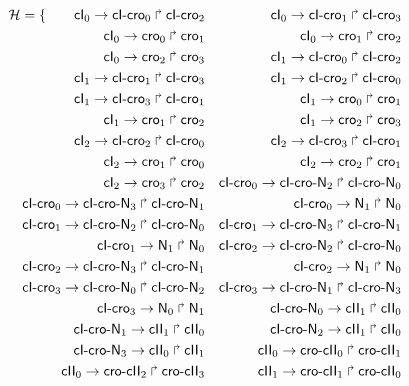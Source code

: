 
\clearpage


\small
\begin{align*}
\PHh = \{ \qquad
  \PHfrappe{\cI_0}{\cIcro_0}{\cIcro_2} &&
  \PHfrappe{\cI_0}{\cIcro_1}{\cIcro_3} \\
  \PHfrappe{\cI_0}{\cro_0}{\cro_1} &&
  \PHfrappe{\cI_0}{\cro_1}{\cro_2} \\
  \PHfrappe{\cI_0}{\cro_2}{\cro_3} &&
  \PHfrappe{\cI_1}{\cIcro_0}{\cIcro_2} \\
  \PHfrappe{\cI_1}{\cIcro_1}{\cIcro_3} &&
  \PHfrappe{\cI_1}{\cIcro_2}{\cIcro_0} \\
  \PHfrappe{\cI_1}{\cIcro_3}{\cIcro_1} &&
  \PHfrappe{\cI_1}{\cro_0}{\cro_1} \\
  \PHfrappe{\cI_1}{\cro_1}{\cro_2} &&
  \PHfrappe{\cI_1}{\cro_2}{\cro_3} \\
  \PHfrappe{\cI_2}{\cIcro_2}{\cIcro_0} &&
  \PHfrappe{\cI_2}{\cIcro_3}{\cIcro_1} \\
  \PHfrappe{\cI_2}{\cro_1}{\cro_0} &&
  \PHfrappe{\cI_2}{\cro_2}{\cro_1} \\
  \PHfrappe{\cI_2}{\cro_3}{\cro_2} &&
  \PHfrappe{\cIcro_0}{\cIcroN_2}{\cIcroN_0} \\
  \PHfrappe{\cIcro_0}{\cIcroN_3}{\cIcroN_1} &&
  \PHfrappe{\cIcro_0}{\N_1}{\N_0} \\
  \PHfrappe{\cIcro_1}{\cIcroN_2}{\cIcroN_0} &&
  \PHfrappe{\cIcro_1}{\cIcroN_3}{\cIcroN_1} \\
  \PHfrappe{\cIcro_1}{\N_1}{\N_0} &&
  \PHfrappe{\cIcro_2}{\cIcroN_2}{\cIcroN_0} \\
  \PHfrappe{\cIcro_2}{\cIcroN_3}{\cIcroN_1} &&
  \PHfrappe{\cIcro_2}{\N_1}{\N_0} \\
  \PHfrappe{\cIcro_3}{\cIcroN_0}{\cIcroN_2} &&
  \PHfrappe{\cIcro_3}{\cIcroN_1}{\cIcroN_3} \\
  \PHfrappe{\cIcro_3}{\N_0}{\N_1} &&
  \PHfrappe{\cIcroN_0}{\cII_1}{\cII_0} \\
  \PHfrappe{\cIcroN_1}{\cII_1}{\cII_0} &&
  \PHfrappe{\cIcroN_2}{\cII_1}{\cII_0} \\
  \PHfrappe{\cIcroN_3}{\cII_0}{\cII_1} &&
  \PHfrappe{\cII_0}{\crocII_0}{\crocII_1} \\
  \PHfrappe{\cII_0}{\crocII_2}{\crocII_3} &&
  \PHfrappe{\cII_1}{\crocII_1}{\crocII_0} \\

\end{align*}

